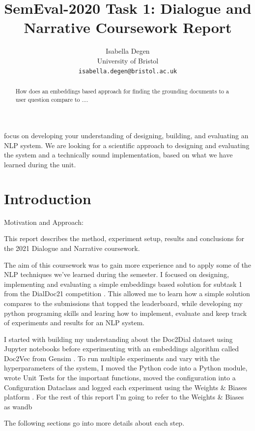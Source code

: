 \documentclass[11pt]{article}
\title{SemEval-2020 Task 1: Dialogue and Narrative Coursework Report}
\author{Isabella Degen \\ University of Bristol \\ {\tt isabella.degen@bristol.ac.uk}}
\date{}
\begin{document}
    \maketitle

    \begin{abstract}
        How does an embeddings based approach for finding the grounding documents to a user question compare to ....

    \end{abstract}

    focus on developing your understanding of designing,  building,  and evaluating an NLP system.
    We are looking for a scientific approach to designing and evaluating the system and a technically sound implementation,
    based on what we have learned during the unit.


    \section{Introduction}\label{sec:introduction}
    Motivation and Approach:

    This report describes the method, experiment setup, results and conclusions for the 2021 Dialogue and Narrative
    coursework.

    The aim of this coursework was to gain more experience and to apply some of the NLP techniques we've learned during
    the semester. I focused on designing, implementing and evaluating a simple embeddings based solution for
    subtask 1 from the DialDoc21
    competition \cite{feng-etal-2020-doc2dial}.
    This allowed me to learn how a simple solution compares to the submissions that topped the leaderboard,
    while developing my python programing skills and
    learing how to implement, evaluate and keep track of experiments and results for an NLP system.

    I started with building my understanding about the Doc2Dial dataset \cite{feng-etal-2020-doc2dial} using Jupyter notebooks
    before experimenting with an embeddings algorithm called Doc2Vec from Gensim \cite{rehurek_lrec}.
    To run multiple experiments and vary with the hyperparameters of the system,
    I moved the Python code into a Python module, wrote Unit Tests for the important functions, moved the configuration
    into a Configuration Dataclass and logged each experiment using
    the Weights \& Biases platform \cite{wandb}. For the rest of this report I'm going to refer to the Weights \& Biases
    as wandb

    The following sections go into more details about each step.
\end{document}

